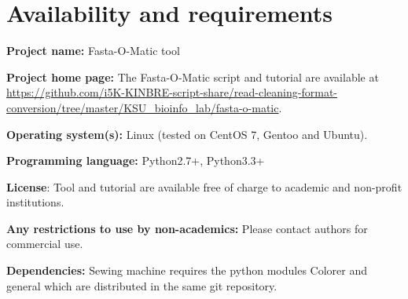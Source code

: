 \section{Availability and requirements}
\textbf{Project name:} Fasta-O-Matic tool

\textbf{Project home page:} The Fasta-O-Matic script and tutorial are available at \url{https://github.com/i5K-KINBRE-script-share/read-cleaning-format-conversion/tree/master/KSU\_bioinfo\_lab/fasta-o-matic}. 

\textbf{Operating system(s):} Linux (tested on CentOS 7, Gentoo and Ubuntu).

\textbf{Programming language:} Python2.7+, Python3.3+

\textbf{License}: Tool and tutorial are available free of charge to academic and non-profit institutions.

\textbf{Any restrictions to use by non-academics:} Please contact authors for commercial use.

\textbf{Dependencies:} Sewing machine requires the python modules Colorer and general which are distributed in the same git repository.


